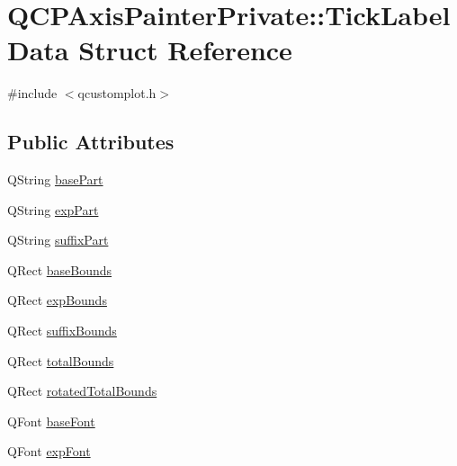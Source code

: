 \hypertarget{struct_q_c_p_axis_painter_private_1_1_tick_label_data}{}\section{Q\+C\+P\+Axis\+Painter\+Private\+:\+:Tick\+Label\+Data Struct Reference}
\label{struct_q_c_p_axis_painter_private_1_1_tick_label_data}


{\ttfamily \#include $<$qcustomplot.\+h$>$}

\subsection*{Public Attributes}
\begin{DoxyCompactItemize}
\item 
Q\+String \hyperlink{struct_q_c_p_axis_painter_private_1_1_tick_label_data_ad65b76a5cafc412179a20b5d79809fc4}{base\+Part}
\item 
Q\+String \hyperlink{struct_q_c_p_axis_painter_private_1_1_tick_label_data_a09692e4ea092137278b4ac051d5fdf2b}{exp\+Part}
\item 
Q\+String \hyperlink{struct_q_c_p_axis_painter_private_1_1_tick_label_data_a3cbf21c6411730a318f8d2287b77d840}{suffix\+Part}
\item 
Q\+Rect \hyperlink{struct_q_c_p_axis_painter_private_1_1_tick_label_data_aac1047ae6ab8e9f5a42923082aabfff5}{base\+Bounds}
\item 
Q\+Rect \hyperlink{struct_q_c_p_axis_painter_private_1_1_tick_label_data_a6722d2bcefb93011e9dc42301b966846}{exp\+Bounds}
\item 
Q\+Rect \hyperlink{struct_q_c_p_axis_painter_private_1_1_tick_label_data_aa286a44422223bd4f0b044cc822079f6}{suffix\+Bounds}
\item 
Q\+Rect \hyperlink{struct_q_c_p_axis_painter_private_1_1_tick_label_data_afbb3163cf4c628914f1b703945419ea5}{total\+Bounds}
\item 
Q\+Rect \hyperlink{struct_q_c_p_axis_painter_private_1_1_tick_label_data_aa4d38c5ea47c9184a78ee33ae7f1012e}{rotated\+Total\+Bounds}
\item 
Q\+Font \hyperlink{struct_q_c_p_axis_painter_private_1_1_tick_label_data_a0d4958a706debaa8d19a9b65fc090d56}{base\+Font}
\item 
Q\+Font \hyperlink{struct_q_c_p_axis_painter_private_1_1_tick_label_data_adc10767ebcb719d6927c012a38b9d933}{exp\+Font}
\end{DoxyCompactItemize}


